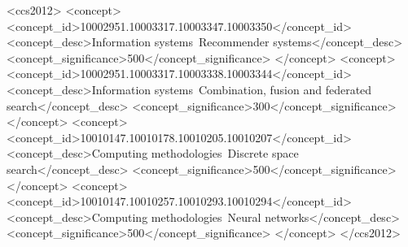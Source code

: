 \documentclass[sigconf]{acmart}
\begin{document}
\begin{CCSXML}
<ccs2012>
   <concept>
       <concept_id>10002951.10003317.10003347.10003350</concept_id>
       <concept_desc>Information systems~Recommender systems</concept_desc>
       <concept_significance>500</concept_significance>
       </concept>
   <concept>
       <concept_id>10002951.10003317.10003338.10003344</concept_id>
       <concept_desc>Information systems~Combination, fusion and federated search</concept_desc>
       <concept_significance>300</concept_significance>
       </concept>
   <concept>
       <concept_id>10010147.10010178.10010205.10010207</concept_id>
       <concept_desc>Computing methodologies~Discrete space search</concept_desc>
       <concept_significance>500</concept_significance>
       </concept>
   <concept>
       <concept_id>10010147.10010257.10010293.10010294</concept_id>
       <concept_desc>Computing methodologies~Neural networks</concept_desc>
       <concept_significance>500</concept_significance>
       </concept>
 </ccs2012>
\end{CCSXML}




\maketitle











\end{document}
